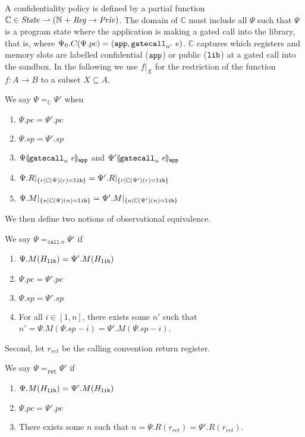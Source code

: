 A confidentiality policy is defined by a partial function $\mathbb{C} \in \mathit{State} \rightharpoonup (\mathbb{N} \mathrel{+} \mathit{Reg} \rightarrow \mathit{Priv})$.
%
The domain of $\mathbb{C}$ must include all $\Psi$ such that $\Psi$ is a program
state where the application is making a gated call into the library, that is,
where $\Psi_0.C(\Psi.pc) = (\mathtt{app}, \mathtt{gatecall}_{n'}\ {e})$.
%
$\mathbb{C}$ captures which registers and memory slots are labelled confidential
($\mathtt{app}$) or public ($\mathtt{lib}$) at a gated call into the sandbox.
%
In the following we use $f|_{X}$ for the restriction of the function $f : A
\rightarrow B$ to a subset $X \subseteq A$.

We say $\Psi =_{\mathbb{C}} \Psi'$ when
\begin{enumerate}
\item $\Psi.pc = \Psi'.pc$
\item $\Psi.sp = \Psi'.sp$
\item ${\Psi}\llparenthesis{\ensuremath{\mathtt{gatecall}_{n}\ {e}}}\rrparenthesis_{\mathtt{app}}$ and ${\Psi'}\llparenthesis{\ensuremath{\mathtt{gatecall}_{n}\ {e}}}\rrparenthesis_{\mathtt{app}}$
\item $\Psi.R|_{\{r \mid \mathbb{C}(\Psi)(r) = \mathtt{lib}\}} = \Psi'.R|_{\{r \mid \mathbb{C}(\Psi')(r) = \mathtt{lib}\}}$
\item $\Psi.M|_{\{n \mid \mathbb{C}(\Psi)(n) = \mathtt{lib}\}} = \Psi'.M|_{\{n \mid \mathbb{C}(\Psi')(n) = \mathtt{lib}\}}$
\end{enumerate}

We then define two notions of observational equivalence.
%
\begin{definition} \label{appendix:call-equivalence}
  We say $\Psi =_{\mathtt{call}\ n} \Psi'$ if
  \begin{enumerate}
  \item $\Psi.M(H_{\mathtt{lib}}) = \Psi'.M(H_{\mathtt{lib}})$

  \item $\Psi.pc = \Psi'.pc$

  \item $\Psi.sp = \Psi'.sp$

  \item For all $i \in [1, n]$, there exists some $n'$ such that $n' = \Psi.M(\Psi.sp - i) = \Psi'.M(\Psi.sp - i)$.
  \end{enumerate}
\end{definition}

Second, let $r_{ret}$ be the calling convention return register.
%
\begin{definition} \label{appendix:ret-equivalence}
  We say $\Psi =_{\mathtt{ret}} \Psi'$ if
  \begin{enumerate}
  \item $\Psi.M(H_{\mathtt{lib}}) = \Psi'.M(H_{\mathtt{lib}})$

  \item $\Psi.pc = \Psi'.pc$

  \item There exists some $n$ such that $n = \Psi.R(r_{ret}) = \Psi'.R(r_{ret})$.
  \end{enumerate}
\end{definition}

